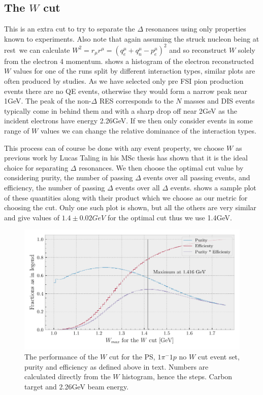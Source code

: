 \documentclass[a4paper,12pt]{article}
\begin{document}
\subsection{The $W$ cut}
This is an extra cut to try to separate the $\Delta$ resonances using only properties known to experiments.
Also note that again assuming the struck nucleon being at rest\footnotemark\ we can calculate $W^2 = r_\mu r^\mu = (q_e^\mu + q_n^\mu - p_e^\mu)^2$ and so reconstruct $W$ solely from the electron 4 momentum.
 shows a histogram of the electron reconstructed $W$ values for one of the runs split by different interaction types, similar plots are often produced by studies.
As we have selected only pre FSI pion production events there are no QE events, otherwise they would form a narrow peak near 1\si{GeV}.
The peak of the non-$\Delta$ RES corresponds to the $N$ masses and DIS events typically come in behind them and with a sharp drop off near 2\si{GeV} as the incident electrons have energy 2.26\si{GeV}.
If we then only consider events in some range of $W$ values we can change the relative dominance of the interaction types.

This process can of course be done with any event property, we choose $W$ as previous work by Lucas Taling in his MSc thesis has shown that it is the ideal choice for separating $\Delta$ resonances.
We then choose the optimal cut value by considering purity, the number of passing $\Delta$ events over all passing events, and efficiency, the number of passing $\Delta$ events over all $\Delta$ events.
 shows a sample plot of these quantities along with their product which we choose as our metric for choosing the cut.
Only one such plot is shown, but all the others are very similar and give values of $1.4 \pm 0.02 \si{GeV}$ for the optimal cut thus we use 1.4\si{GeV}.

\begin{figure}[H]
    \centering
    \includegraphics{figures/python/W_cut_metr.pdf}
    \caption{
        The performance of the $W$ cut for the PS, $1\pi^-1p$ no $W$ cut event set, purity and efficiency as defined above in text.
        Numbers are calculated directly from the $W$ histogram, hence the steps.
        Carbon target and 2.26\si{GeV} beam energy.
    }\label{fig:W_cut_metr}
\end{figure}
\end{document}
